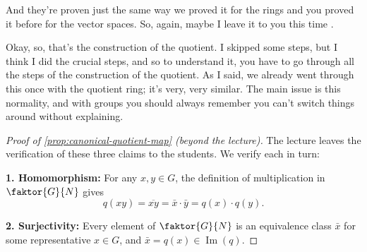 \begin{proofWrapper}
\begin{content}

\end{content}

\begin{speech}[01:07:52 - 01:08:46]
And they're proven just the same way we proved it for the rings and you proved it before for the vector spaces. So, again, maybe I leave it to you this time .

Okay, so, that's the construction of the quotient. I skipped some steps, but I think I did the crucial steps, and so to understand it, you have to go through all the steps of the construction of the quotient. As I said, we already went through this once with the quotient ring; it's very, very similar. The main issue is this normality, and with groups you should always remember you can't switch things around without explaining.
\end{speech}

\begin{content}
\begin{proof}[Proof of \cref{prop:canonical-quotient-map} (beyond the lecture)]
The lecture leaves the verification of these three claims to the students. We verify each in turn:

\textbf{1. Homomorphism:} For any $x, y \in G$, the definition of multiplication in $\faktor{G}{N}$ gives
\[
q(xy) = \overline{xy} = \bar{x} \cdot \bar{y} = q(x) \cdot q(y).
\]

\textbf{2. Surjectivity:} Every element of $\faktor{G}{N}$ is an equivalence class $\bar{x}$ for some representative $x \in G$, and $\bar{x} = q(x) \in \operatorname{Im}(q)$.


\end{proof}
\end{content}
\end{proofWrapper}
